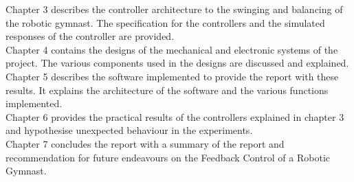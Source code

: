 Chapter 3 describes the controller architecture to the swinging and balancing of the robotic gymnast. The specification for the controllers and the simulated responses of the controller are provided.\\

Chapter 4 contains the designs of the mechanical and electronic systems of the project. The various components used in the designs are discussed and explained.\\

Chapter 5 describes the software implemented to provide the report with these results. It explains the architecture of the software and the various functions implemented.\\

Chapter 6 provides the practical results of the controllers explained in chapter 3 and hypothesise unexpected behaviour in the experiments.\\

Chapter 7 concludes the report with a summary of the report and recommendation for future endeavours on the Feedback Control of a Robotic Gymnast. 

 
